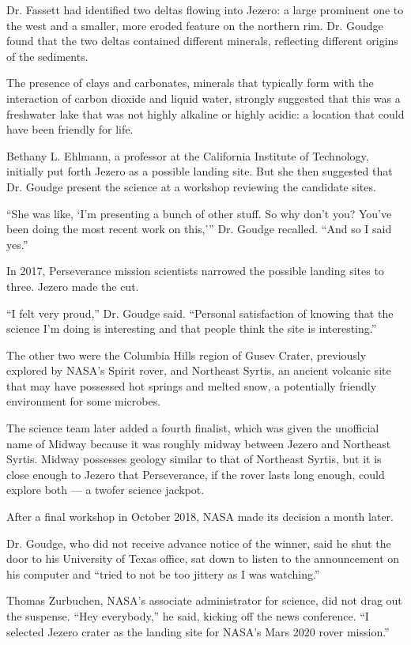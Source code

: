 Dr. Fassett had identified two deltas flowing into Jezero: a large
prominent one to the west and a smaller, more eroded feature on the
northern rim. Dr. Goudge found that the two deltas contained different
minerals, reflecting different origins of the sediments.

The presence of clays and carbonates, minerals that typically form with
the interaction of carbon dioxide and liquid water, strongly suggested
that this was a freshwater lake that was not highly alkaline or highly
acidic: a location that could have been friendly for life.

Bethany L. Ehlmann, a professor at the California Institute of
Technology, initially put forth Jezero as a possible landing site. But
she then suggested that Dr. Goudge present the science at a workshop
reviewing the candidate sites.

``She was like, `I'm presenting a bunch of other stuff. So why don't
you? You've been doing the most recent work on this,''' Dr. Goudge
recalled. ``And so I said yes.''

In 2017, Perseverance mission scientists narrowed the possible landing
sites to three. Jezero made the cut.

``I felt very proud,'' Dr. Goudge said. ``Personal satisfaction of
knowing that the science I'm doing is interesting and that people think
the site is interesting.''

The other two were the Columbia Hills region of Gusev Crater, previously
explored by NASA's Spirit rover, and Northeast Syrtis, an ancient
volcanic site that may have possessed hot springs and melted snow, a
potentially friendly environment for some microbes.

The science team later added a fourth finalist, which was given the
unofficial name of Midway because it was roughly midway between Jezero
and Northeast Syrtis. Midway possesses geology similar to that of
Northeast Syrtis, but it is close enough to Jezero that Perseverance, if
the rover lasts long enough, could explore both --- a twofer science
jackpot.

After a final workshop in October 2018, NASA made its decision a month
later.

Dr. Goudge, who did not receive advance notice of the winner, said he
shut the door to his University of Texas office, sat down to listen to
the announcement on his computer and ``tried to not be too jittery as I
was watching.''

Thomas Zurbuchen, NASA's associate administrator for science, did not
drag out the suspense. ``Hey everybody,'' he said, kicking off the news
conference. ``I selected Jezero crater as the landing site for NASA's
Mars 2020 rover mission.''

